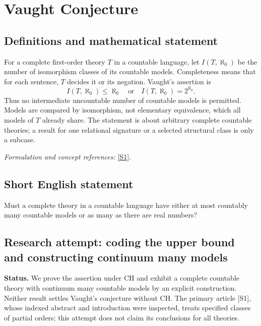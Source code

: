 \documentclass[11pt]{article}
\begin{document}
\section*{\texorpdfstring{Vaught Conjecture}{Vaught Conjecture}}\label{1343}
\subsection{Definitions and mathematical statement}
For a complete first-order theory $T$ in a countable language, let $I(T,\aleph_0)$ be the number of isomorphism classes of its countable models. Completeness means that for each sentence, $T$ decides it or its negation. Vaught's assertion is
\[
 I(T,\aleph_0)\le\aleph_0\quad\text{or}\quad I(T,\aleph_0)=2^{\aleph_0}.
\]
Thus no intermediate uncountable number of countable models is permitted. Models are compared by isomorphism, not elementary equivalence, which all models of $T$ already share. The statement is about arbitrary complete countable theories; a result for one relational signature or a selected structural class is only a subcase.
\par\smallskip\textit{Formulation and concept references:} \href{https://www.sciencedirect.com/science/article/abs/pii/S0168007224000083}{[S1]}.

\subsection{Short English statement}
Must a complete theory in a countable language have either at most countably many countable models or as many as there are real numbers?
\subsection{Research attempt: coding the upper bound and constructing continuum many models}
\textbf{Status.} We prove the assertion under CH and exhibit a complete countable theory with continuum many countable models by an explicit construction. Neither result settles Vaught's conjecture without CH. The primary article [S1], whose indexed abstract and introduction were inspected, treats specified classes of partial orders; this attempt does not claim its conclusions for all theories.
\end{document}
